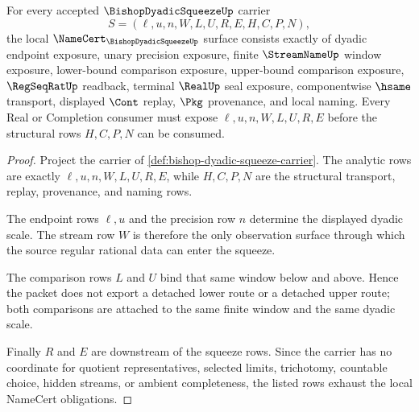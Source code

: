 \begin{theorem}
\label{thm:bishop-dyadic-squeeze-namecert-obligations}
For every accepted $\BishopDyadicSqueezeUp$ carrier
$$
S=(\ell,u,n,W,L,U,R,E,H,C,P,N),
$$
the local $\NameCert_{\BishopDyadicSqueezeUp}$ surface consists exactly of dyadic endpoint exposure, unary precision exposure, finite $\StreamNameUp$ window exposure, lower-bound comparison exposure, upper-bound comparison exposure, $\RegSeqRatUp$ readback, terminal $\RealUp$ seal exposure, componentwise $\hsame$ transport, displayed $\Cont$ replay, $\Pkg$ provenance, and local naming. Every Real or Completion consumer must expose $\ell,u,n,W,L,U,R,E$ before the structural rows $H,C,P,N$ can be consumed.
\end{theorem}
\begin{proof}
Project the carrier of \autoref{def:bishop-dyadic-squeeze-carrier}. The analytic rows are exactly $\ell,u,n,W,L,U,R,E$, while $H,C,P,N$ are the structural transport, replay, provenance, and naming rows.

The endpoint rows $\ell,u$ and the precision row $n$ determine the displayed dyadic scale. The stream row $W$ is therefore the only observation surface through which the source regular rational data can enter the squeeze.

The comparison rows $L$ and $U$ bind that same window below and above. Hence the packet does not export a detached lower route or a detached upper route; both comparisons are attached to the same finite window and the same dyadic scale.

Finally $R$ and $E$ are downstream of the squeeze rows. Since the carrier has no coordinate for quotient representatives, selected limits, trichotomy, countable choice, hidden streams, or ambient completeness, the listed rows exhaust the local NameCert obligations.
\end{proof}

